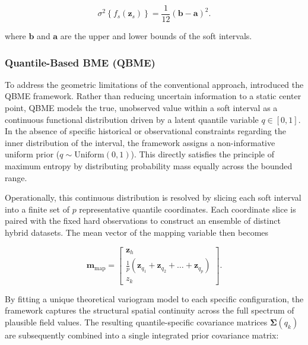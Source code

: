\begin{equation}
\sigma^2\left\{f_s(\boldsymbol{z}_s)\right\} = \frac{1}{12} (\boldsymbol{b}-\boldsymbol{a})^2
\label{eq:sigma}.
\end{equation}

where \(\boldsymbol{b}\) and \(\boldsymbol{a}\) are the upper and lower bounds of the soft intervals.

\subsubsection{Quantile-Based BME (QBME)}\label{quantile-based-bme-qbme}

To address the geometric limitations of the conventional approach, \citet{duah2026random} introduced the QBME framework. Rather than reducing uncertain information to a static center point, QBME models the true, unobserved value within a soft interval as a continuous functional distribution driven by a latent quantile variable \(q \in [0, 1]\). In the absence of specific historical or observational constraints regarding the inner distribution of the interval, the framework assigns a non-informative uniform prior (\(q \sim \text{Uniform}(0, 1)\)). This directly satisfies the principle of maximum entropy by distributing probability mass equally across the bounded range.

Operationally, this continuous distribution is resolved by slicing each soft interval into a finite set of \(p\) representative quantile coordinates. Each coordinate slice is paired with the fixed hard observations to construct an ensemble of distinct hybrid datasets. The mean vector of the mapping variable then becomes

\begin{equation}
\boldsymbol{m}_\mathrm{map} = \begin{bmatrix} \boldsymbol{z}_{h} \\ \frac{1}{p}(\boldsymbol{z}_{q_1} + \boldsymbol{z}_{q_2} + \dots + \boldsymbol{z}_{q_p}) \\ z_k \end{bmatrix}
\label{eq:qm-map}.
\end{equation}

By fitting a unique theoretical variogram model to each specific configuration, the framework captures the structural spatial continuity across the full spectrum of plausible field values. The resulting quantile-specific covariance matrices \(\boldsymbol{\Sigma}(q_k)\) are subsequently combined into a single integrated prior covariance matrix:

